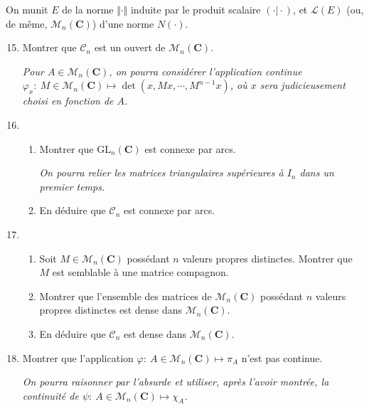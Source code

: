 \documentclass[a4paper,11pt]{article}
\newcommand{\C}{\mathbf{C}}
\newcommand{\M}{\mathcal{M}}
\newcommand{\CC}{\mathcal{C}}
\renewcommand{\L}{\mathcal{L}}
\begin{document}
On munit $E$ de la norme $\Vert\cdot\Vert$ induite par le produit scalaire $(\cdot\vert\cdot)$, et $\L(E)$ (ou, de même, $\M_n(\C)$) d'une norme $N(\cdot)$.
\begin{enumerate}
\setcounter{enumi}{14}
\item Montrer que $\CC_n$ est un ouvert de $\M_n(\C)$.

{\textit{\footnotesize Pour $A\in\M_n(\C)$, on pourra considérer l'application continue $\varphi_x:\ M\in\M_n(\C)\mapsto\det\left(x,Mx,\cdots, M^{n-1}x\right)$, où $x$ sera judicieusement choisi en fonction de $A$.}}
\item 
\begin{enumerate}
\item Montrer que $\mathrm{GL}_n(\C)$ est connexe par arcs.

{\textit{\footnotesize On pourra relier les matrices triangulaires supérieures à $I_n$ dans un premier temps.}}
\item En déduire que $\CC_n$ est connexe par arcs.
\end{enumerate}
\item
\begin{enumerate}
\item Soit $M\in\M_n(\C)$ possédant $n$ valeurs propres distinctes. Montrer que $M$ est semblable à une matrice compagnon.
\item Montrer que l'ensemble des matrices de $\M_n(\C)$ possédant $n$ valeurs propres distinctes est dense dans $\M_n(\C)$.
\item En déduire que $\CC_n$ est dense dans $\M_n(\C)$.
\end{enumerate}
\item Montrer que l'application $\varphi:\ A\in\M_n(\C)\mapsto\pi_A$ n'est pas continue.

{\textit{\footnotesize On pourra raisonner par l'absurde et utiliser, après l'avoir montrée, la continuité de $\psi:\ A\in\M_n(\C)\mapsto\chi_A$.}}
\end{enumerate}
\end{document}
